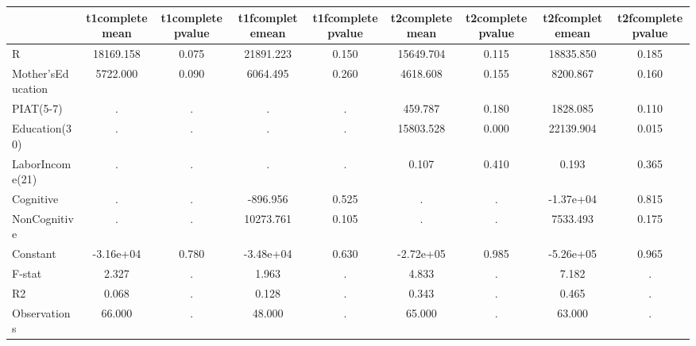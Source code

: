 \begin{table}[htbp]
\begin{tabular}{lcccccccc} \hline \hline
 & t1completemean  & t1completepvalue  & t1fcompletemean  & t1fcompletepvalue  & t2completemean  & t2completepvalue  & t2fcompletemean  & t2fcompletepvalue  \\  \hline 
R & 18169.158 &     0.075 & 21891.223 &     0.150 & 15649.704 &     0.115 & 18835.850 &     0.185 \\  
Mother'sEducation &  5722.000 &     0.090 &  6064.495 &     0.260 &  4618.608 &     0.155 &  8200.867 &     0.160 \\  
PIAT(5-7) &         . &         . &         . &         . &   459.787 &     0.180 &  1828.085 &     0.110 \\  
Education(30) &         . &         . &         . &         . & 15803.528 &     0.000 & 22139.904 &     0.015 \\  
LaborIncome(21) &         . &         . &         . &         . &     0.107 &     0.410 &     0.193 &     0.365 \\  
Cognitive &         . &         . &  -896.956 &     0.525 &         . &         . & -1.37e+04 &     0.815 \\  
NonCognitive &         . &         . & 10273.761 &     0.105 &         . &         . &  7533.493 &     0.175 \\  
Constant & -3.16e+04 &     0.780 & -3.48e+04 &     0.630 & -2.72e+05 &     0.985 & -5.26e+05 &     0.965 \\  
F-stat &     2.327 &         . &     1.963 &         . &     4.833 &         . &     7.182 &         . \\  
R2 &     0.068 &         . &     0.128 &         . &     0.343 &         . &     0.465 &         . \\  
Observations &    66.000 &         . &    48.000 &         . &    65.000 &         . &    63.000 &         . \\  
\hline \hline \end{tabular}
\end{table}
